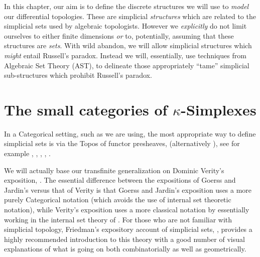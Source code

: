 In this chapter, our aim is to define the discrete structures we will use to \emph{model}
our differential topologies.  These are simplicial \emph{structures} which are related to
the simplicial sets used by algebraic topologists.  However we \emph{explicitly} do not
limit ourselves to either finite dimensions \emph{or} to, potentially, assuming that these
structures are \emph{sets}.  With wild abandon, we will allow simplicial structures which
\emph{might} entail Russell's paradox.  Instead we will, essentially, use techniques from
Algebraic Set Theory (AST), to delineate those appropriately ``tame'' simplicial
sub-structures which prohibit Russell's paradox.  

\section{The small categories of \texorpdfstring{$\kappa$}{kappa}-Simplexes} 

In a Categorical setting, such as we are using, the most appropriate way to define
simplicial sets is via the Topos of functor presheaves, \opFuncCat{\DeltaC{}{}}{\setC{}}
(alternatively \altOpFuncCat{\DeltaC{}{}}{\setC{}}), see for example \cite[Chapter
1]{goerssJardin1999SimplicialHomotopyTh}, \cite[Section VII.5]{maclane1971a},
\cite[section 2.1]{arxiv2005math0410412v2}, \cite[Section
I.2]{may1967simplicialObjectsInAlgTopo}, \cite[Chapter 2]{gabrielZisman1967homotopyTh}
.

We will actually base our transfinite generalization on Dominic Verity's exposition,
\cite[section 2.1]{arxiv2005math0410412v2}. The essential difference between the
expositions of Goerss and Jardin's versus that of Verity is that Goerss and Jardin's
exposition uses a more purely Categorical notation (which avoids the use of internal set
theoretic notation), while Verity's exposition uses a more classical notation by
essentially working in the internal set theory of \setC{}.  For those who are not familiar
with simplicial topology, Friedman's expository account of simplicial sets,
\cite{arxiv2008math0809.4221v1}, provides a highly recommended introduction to this theory
with a good number of visual explanations of what is going on both combinatorially as well
as geometrically.


